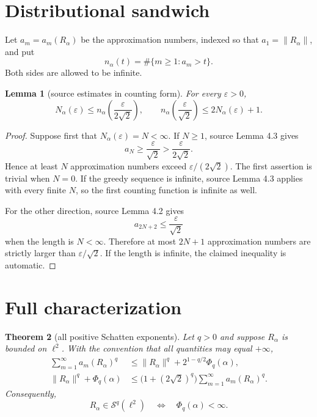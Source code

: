 \documentclass[11pt]{article}
\newtheorem{theorem}{Theorem}
\newtheorem{lemma}[theorem]{Lemma}
\newcommand{\norm}[1]{\lVert#1\rVert}
\newcommand{\Ncount}{N_\alpha}
\newcommand{\Schatten}{\mathcal S}
\begin{document}
\section{Distributional sandwich}

Let $a_m=a_m(R_\alpha)$ be the approximation numbers, indexed so that
$a_1=\norm{R_\alpha}$, and put
\[
 n_\alpha(t)=\#\{m\geq1:a_m>t\}.
\]
Both sides are allowed to be infinite.

\begin{lemma}[source estimates in counting form]\label{lem:sandwich}
For every $\varepsilon>0$,
\begin{equation}\label{eq:sandwich}
 \Ncount(\varepsilon)
 \leq n_\alpha\!\left(\frac{\varepsilon}{2\sqrt2}\right),
 \qquad
 n_\alpha\!\left(\frac{\varepsilon}{\sqrt2}\right)
 \leq2\Ncount(\varepsilon)+1.
\end{equation}
\end{lemma}

\begin{proof}
Suppose first that $\Ncount(\varepsilon)=N<\infty$.  If $N\geq1$, source
Lemma 4.3 gives
\[
 a_N\geq\frac{\varepsilon}{\sqrt2}
       >\frac{\varepsilon}{2\sqrt2}.
\]
Hence at least $N$ approximation numbers exceed
$\varepsilon/(2\sqrt2)$.  The first assertion is trivial when $N=0$.
If the greedy sequence is infinite, source Lemma 4.3 applies with every
finite $N$, so the first counting function is infinite as well.

For the other direction, source Lemma 4.2 gives
\[
 a_{2N+2}\leq\frac{\varepsilon}{\sqrt2}
\]
when the length is $N<\infty$.  Therefore at most $2N+1$ approximation
numbers are strictly larger than $\varepsilon/\sqrt2$.  If the length is
infinite, the claimed inequality is automatic.
\end{proof}

\section{Full characterization}

\begin{theorem}[all positive Schatten exponents]\label{thm:main}
Let $q>0$ and suppose $R_\alpha$ is bounded on $\ell^2$.  With the convention
that all quantities may equal $+\infty$,
\begin{align}
 \sum_{m=1}^\infty a_m(R_\alpha)^q
 &\leq \norm{R_\alpha}^q+2^{1-q/2}\Phi_q(\alpha),
 \label{eq:upper}\tag{A}\\
 \norm{R_\alpha}^q+\Phi_q(\alpha)
 &\leq\bigl(1+(2\sqrt2)^q\bigr)
       \sum_{m=1}^\infty a_m(R_\alpha)^q.
 \label{eq:lower}\tag{B}
\end{align}
Consequently,
\begin{equation}\label{eq:criterion}
 R_\alpha\in\Schatten^q(\ell^2)
 \quad\Longleftrightarrow\quad
 \Phi_q(\alpha)<\infty.
\end{equation}
\end{theorem}
\end{document}
